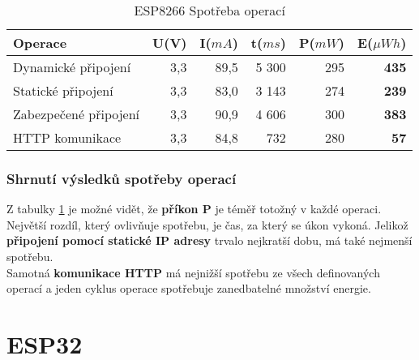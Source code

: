 \documentclass[a4paper, 12pt]{report}
\begin{document}
				\begin{table}[h]
					\centering
					\caption{ESP8266 Spotřeba operací}
					\begin{tabular}{||l| r r r r |r||}
						\hline
						Operace & U(V) & I($mA$) & t($ms$) & P($mW$) & \textbf{E}($\mu Wh$)\\
						\hline
						\hline
					Dynamické připojení & 3,3 & 89,5 & 5 300 & 295 & \textbf{435}\\
					Statické připojení & 3,3 & 83,0 & 3 143 & 274 & \textbf{239}\\
					Zabezpečené připojení & 3,3 & 90,9 & 4 606 & 300 & \textbf{383}\\
					HTTP komunikace & 3,3 & 84,8 & 732 & 280 & \textbf{57}\\
					\hline
					\end{tabular}
					\label{Spotreba_operaci}
				\end{table}

				\subsubsection{Shrnutí výsledků spotřeby operací}
					Z tabulky \ref{Spotreba_operaci} je možné vidět, že {\bf příkon P} je téměř totožný v každé operaci. Největší rozdíl, který ovlivňuje spotřebu, je čas, za který se úkon vykoná. Jelikož {\bf připojení pomocí statické IP adresy} trvalo nejkratší dobu, má také nejmenší spotřebu.\\
					Samotná {\bf komunikace HTTP} má nejnižší spotřebu ze všech definovaných operací a jeden cyklus operace spotřebuje zanedbatelné množství energie.
		\section{ESP32}





\end{document}
